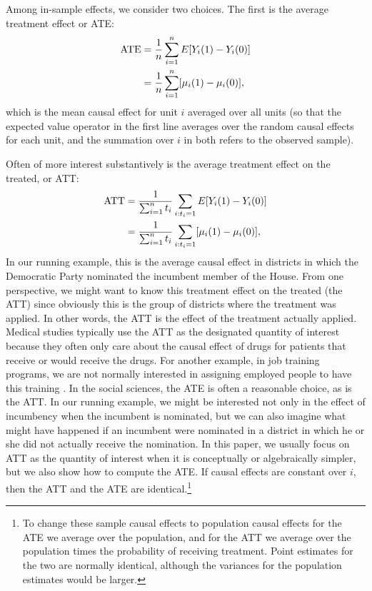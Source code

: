 \documentclass[11pt,titlepage]{article}
\begin{document}
Among in-sample effects, we consider two choices.  The first is the
average treatment effect or ATE:
\begin{align}
  \label{pate}
  \text{ATE} & = \frac{1}{n}\sum_{i=1}^n E[Y_i(1) - Y_i(0)] \notag\\
  &  = \frac{1}{n}\sum_{i=1}^n[\mu_i(1) - \mu_i(0)],
\end{align}
which is the mean causal effect for unit $i$ averaged over all units
(so that the expected value operator in the first line averages over
the random causal effects for each unit, and the summation over $i$ in
both refers to the observed sample).

Often of more interest substantively is the average treatment effect
on the treated, or ATT:
\begin{align}
  \label{att}
  \text{ATT} & = \frac{1}{\sum_{i=1}^n t_i}\sum_{i:t_i=1} E[Y_i(1) -
  Y_i(0)]\notag\\ 
  & = \frac{1}{\sum_{i=1}^n t_i}\sum_{i:t_i=1}[\mu_i(1) - \mu_i(0)],
\end{align}
In our running example, this is the average causal effect in districts
in which the Democratic Party nominated the incumbent member of the
House.  From one perspective, we might want to know this treatment
effect on the treated (the ATT) since obviously this is the group of
districts where the treatment was applied.  In other words, the ATT is
the effect of the treatment actually applied.  Medical studies
typically use the ATT as the designated quantity of interest because
they often only care about the causal effect of drugs for patients
that receive or would receive the drugs.  For another example, in job
training programs, we are not normally interested in assigning
employed people to have this training \citep{HecIchTod98}.  In the
social sciences, the ATE is often a reasonable choice, as is the ATT.
In our running example, we might be interested not only in the effect
of incumbency when the incumbent is nominated, but we can also imagine
what might have happened if an incumbent were nominated in a district
in which he or she did not actually receive the nomination.  In this
paper, we usually focus on ATT as the quantity of interest when it is
conceptually or algebraically simpler, but we also show how to compute
the ATE.  If causal effects are constant over $i$, then the ATT and
the ATE are identical.\footnote{To change these sample causal effects
  to population causal effects for the ATE we average over the
  population, and for the ATT we average over the population times the
  probability of receiving treatment.  Point estimates for the two are
  normally identical, although the variances for the population
  estimates would be larger.}
\end{document}
